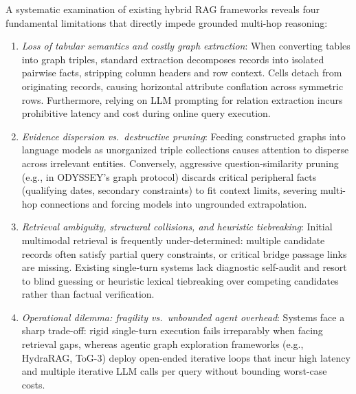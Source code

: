 \documentclass[runningheads]{llncs}
\begin{document}
A systematic examination of existing hybrid RAG frameworks reveals four fundamental limitations that directly impede grounded multi-hop reasoning:
\begin{enumerate}
    \item \emph{Loss of tabular semantics and costly graph extraction}: When converting tables into graph triples, standard extraction decomposes records into isolated pairwise facts, stripping column headers and row context. Cells detach from originating records, causing horizontal attribute conflation across symmetric rows. Furthermore, relying on LLM prompting for relation extraction incurs prohibitive latency and cost during online query execution.
    \item \emph{Evidence dispersion vs.\ destructive pruning}: Feeding constructed graphs into language models as unorganized triple collections causes attention to disperse across irrelevant entities. Conversely, aggressive question-similarity pruning (e.g., in ODYSSEY's graph protocol) discards critical peripheral facts (qualifying dates, secondary constraints) to fit context limits, severing multi-hop connections and forcing models into ungrounded extrapolation.
    \item \emph{Retrieval ambiguity, structural collisions, and heuristic tiebreaking}: Initial multimodal retrieval is frequently under-determined: multiple candidate records often satisfy partial query constraints, or critical bridge passage links are missing. Existing single-turn systems lack diagnostic self-audit and resort to blind guessing or heuristic lexical tiebreaking over competing candidates rather than factual verification.
    \item \emph{Operational dilemma: fragility vs.\ unbounded agent overhead}: Systems face a sharp trade-off: rigid single-turn execution fails irreparably when facing retrieval gaps, whereas agentic graph exploration frameworks (e.g., HydraRAG, ToG-3) deploy open-ended iterative loops that incur high latency and multiple iterative LLM calls per query without bounding worst-case costs.
\end{enumerate}
\end{document}
